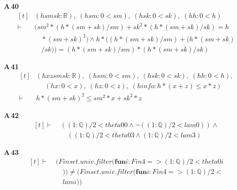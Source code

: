 \noindent\textbf{A\,40}\quad{}
{\footnotesize\[ \begin{aligned}[t]
&(\mathit{h} \mathit{sm} \mathit{sk} : \mathbb{R} ),\; (\mathit{hsm} : 0 < \mathit{sm}),\; (\mathit{hsk} : 0 < \mathit{sk}),\; (\mathit{hh} : 0 < \mathit{h})\\
\vdash\;&(\mathit{sm} ^{2} * (\mathit{h} * (\mathit{sm} + \mathit{sk}) / \mathit{sm}) + \mathit{sk} ^{2} * (\mathit{h} * (\mathit{sm} + \mathit{sk}) / \mathit{sk}) = \mathit{h}\\
&\quad * (\mathit{sm} + \mathit{sk}) ^{2}) \wedge \mathit{h} * ((\mathit{h} * (\mathit{sm} + \mathit{sk}) / \mathit{sm}) + (\mathit{h} * (\mathit{sm} + \mathit{sk})\\
&\quad / \mathit{sk})) = (\mathit{h} * (\mathit{sm} + \mathit{sk}) / \mathit{sm}) * (\mathit{h} * (\mathit{sm} + \mathit{sk}) / \mathit{sk})
\end{aligned} \]}

\noindent\textbf{A\,41}\quad{}
{\footnotesize\[ \begin{aligned}[t]
&(\mathit{h} \mathit{x} \mathit{z} \mathit{sm} \mathit{sk} : \mathbb{R} ),\; (\mathit{hsm} : 0 < \mathit{sm}),\; (\mathit{hsk} : 0 < \mathit{sk}),\; (\mathit{hh} : 0 < \mathit{h}),\\
&\quad \; (\mathit{hx} : 0 < \mathit{x}),\; (\mathit{hz} : 0 < \mathit{z}),\; (\mathit{hinfo} : \mathit{h} * (\mathit{x} + \mathit{z}) \leq \mathit{x} * \mathit{z})\\
\vdash\;&\mathit{h} * (\mathit{sm} + \mathit{sk}) ^{2} \leq \mathit{sm} ^{2} * \mathit{x} + \mathit{sk} ^{2} * \mathit{z}
\end{aligned} \]}

\noindent\textbf{A\,42}\quad{}
{\footnotesize\[ \begin{aligned}[t]
\vdash\;&((1:\mathbb{Q} )/2 < \mathit{theta0} 0 \wedge \neg ((1:\mathbb{Q} )/2 < \mathit{lam} 0)) \wedge\\
&\quad ((1:\mathbb{Q} )/2 < \mathit{theta0} 3 \wedge (1:\mathbb{Q} )/2 < \mathit{lam} 3)
\end{aligned} \]}

\noindent\textbf{A\,43}\quad{}
{\footnotesize\[ \begin{aligned}[t]
\vdash\;&(\mathit{Finset}.\mathit{univ}.\mathit{filter} (\mathbf{fun} \mathit{i} : \mathit{Fin} 4 => (1:\mathbb{Q} )/2 < \mathit{theta0} \mathit{i}\\
&\quad )) \neq (\mathit{Finset}.\mathit{univ}.\mathit{filter} (\mathbf{fun} \mathit{i} : \mathit{Fin} 4 => (1:\mathbb{Q} )/2 <\\
&\quad \mathit{lam} \mathit{i}))
\end{aligned} \]}

